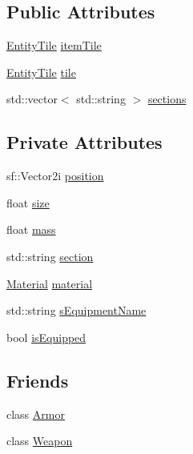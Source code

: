 \subsection*{Public Attributes}
\begin{DoxyCompactItemize}
\item 
\mbox{\hyperlink{class_entity_tile}{Entity\+Tile}} \mbox{\hyperlink{class_item_a9ba716084bdafdbd767aade37259b56b}{item\+Tile}}
\item 
\mbox{\hyperlink{class_entity_tile}{Entity\+Tile}} \mbox{\hyperlink{class_item_a1784c30db978d4858e34cf812ff261d5}{tile}}
\item 
std\+::vector$<$ std\+::string $>$ \mbox{\hyperlink{class_item_ad0dfdfafbff3d22f196c19db4ce1eb40}{sections}}
\end{DoxyCompactItemize}
\subsection*{Private Attributes}
\begin{DoxyCompactItemize}
\item 
sf\+::\+Vector2i \mbox{\hyperlink{class_item_ad1c1601358e5c56063390327e0d86ce1}{position}}
\item 
float \mbox{\hyperlink{class_item_af6193bebd888e699303f91bee96d9f16}{size}}
\item 
float \mbox{\hyperlink{class_item_a59f0500b0a1a2c5e6590deb7ff58db7b}{mass}}
\item 
std\+::string \mbox{\hyperlink{class_item_a23ee78e35c27520fce1ddfe2c56f88a0}{section}}
\item 
\mbox{\hyperlink{class_material}{Material}} \mbox{\hyperlink{class_item_a6b060c7156a9089e58869c8c4776bf4d}{material}}
\item 
std\+::string \mbox{\hyperlink{class_item_ab551fd7ec7c75a6d125cad56fe84b30a}{s\+Equipment\+Name}}
\item 
bool \mbox{\hyperlink{class_item_a47a03cb11d41796494640d62f4d6b9d2}{is\+Equipped}}
\end{DoxyCompactItemize}
\subsection*{Friends}
\begin{DoxyCompactItemize}
\item 
class \mbox{\hyperlink{class_item_aacd78ed1db38c3d74aa80233c16b3e9c}{Armor}}
\item 
class \mbox{\hyperlink{class_item_ab356dbee0f1e915287732c65e8ef61e1}{Weapon}}
\end{DoxyCompactItemize}


